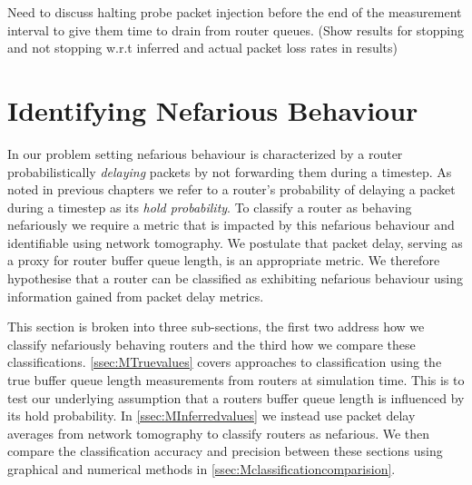 Need to discuss halting probe packet injection before the end of the measurement interval to give them time to drain from router queues. (Show results for stopping and not stopping w.r.t inferred and actual packet loss rates in results)
    
\section{Identifying Nefarious Behaviour}
\label{sec:MNefidentification}
  In our problem setting nefarious behaviour is characterized by a router probabilistically \textit{delaying} packets by not forwarding them during a timestep. As noted in previous chapters we refer to a router's probability of delaying a packet during a timestep as its \textit{hold probability}. To classify a router as behaving nefariously we require a metric that is impacted by this nefarious behaviour and identifiable using network tomography. We postulate that packet delay, serving as a proxy for router buffer queue length, is an appropriate metric. We therefore hypothesise that a router can be classified as exhibiting nefarious behaviour using information gained from packet delay metrics.\par
  This section is broken into three sub-sections, the first two address how we classify nefariously behaving routers and the third how we compare these classifications. \cref{ssec:MTruevalues} covers approaches to classification using the true buffer queue length measurements from routers at simulation time. This is to test our underlying assumption that a routers buffer queue length is influenced by its hold probability. In \cref{ssec:MInferredvalues} we instead use packet delay averages from network tomography to classify routers as nefarious. We then compare the classification accuracy and precision between these sections using graphical and numerical methods in \cref{ssec:Mclassificationcomparision}.
  
